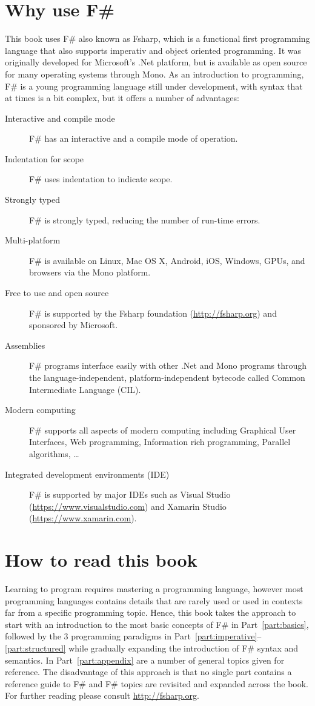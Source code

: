 \section{Why use F\#}
This book uses F\# also known as Fsharp, which is a functional first programming language that also supports imperativ and object oriented programming. It was originally developed for Microsoft's .Net platform, but is available as open source for many operating systems through Mono. As an introduction to programming, F\# is a young programming language still under development, with syntax that at times is a bit complex, but it offers a number of advantages:
\begin{description}
\item[Interactive and compile mode] F\# has an interactive and a compile mode of operation.
\item[Indentation for scope] F\# uses indentation to indicate scope.
\item[Strongly typed] F\# is strongly typed, reducing the number of run-time errors.
\item[Multi-platform] F\# is available on Linux, Mac OS X, Android, iOS, Windows, GPUs, and browsers via the Mono platform.
\item[Free to use and open source] F\# is supported by the Fsharp foundation (\url{http://fsharp.org}) and sponsored by Microsoft.
\item[Assemblies] F\# programs interface easily with other .Net and Mono programs through the language-independent, platform-independent bytecode called Common Intermediate Language (CIL).
\item[Modern computing] F\# supports all aspects of modern computing including Graphical User Interfaces, Web programming, Information rich programming, Parallel algorithms, \dots
\item[Integrated development environments (IDE)] F\# is supported by major IDEs such as Visual Studio (\url{https://www.visualstudio.com}) and Xamarin Studio (\url{https://www.xamarin.com}).
\end{description}

\section{How to read this book}
Learning to program requires mastering a programming language, however most programming languages contains details that are rarely used or used in contexts far from a specific programming topic. Hence, this book takes the approach to start with an introduction to the most basic concepts of F\# in Part~\ref{part:basics}, followed by the 3 programming paradigms in Part~\ref{part:imperative}--\ref{part:structured} while gradually expanding the introduction of F\# syntax and semantics. In Part~\ref{part:appendix} are a number of general topics given for reference. The disadvantage of this approach is that no single part contains a reference guide to F\# and F\# topics are revisited and expanded across the book. For further reading please consult \url{http://fsharp.org}.

